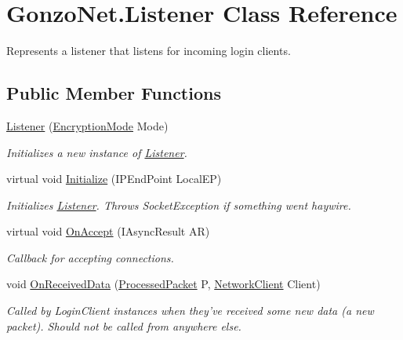 \hypertarget{class_gonzo_net_1_1_listener}{\section{Gonzo\+Net.\+Listener Class Reference}
\label{class_gonzo_net_1_1_listener}
}


Represents a listener that listens for incoming login clients.  


\subsection*{Public Member Functions}
\begin{DoxyCompactItemize}
\item 
\hyperlink{class_gonzo_net_1_1_listener_ae312dc6a8b04b59943c48ebebe649652}{Listener} (\hyperlink{namespace_gonzo_net_1_1_encryption_af0c5afc1c3ebbb6e3798067325cc50b9}{Encryption\+Mode} Mode)
\begin{DoxyCompactList}\small\item\em Initializes a new instance of \hyperlink{class_gonzo_net_1_1_listener}{Listener}. \end{DoxyCompactList}\item 
virtual void \hyperlink{class_gonzo_net_1_1_listener_ad43fb01c66819e744e8ad1e246a61190}{Initialize} (I\+P\+End\+Point Local\+E\+P)
\begin{DoxyCompactList}\small\item\em Initializes \hyperlink{class_gonzo_net_1_1_listener}{Listener}. Throws Socket\+Exception if something went haywire. \end{DoxyCompactList}\item 
virtual void \hyperlink{class_gonzo_net_1_1_listener_a98e103fe10d7c61053bad1669adbd1e4}{On\+Accept} (I\+Async\+Result A\+R)
\begin{DoxyCompactList}\small\item\em Callback for accepting connections. \end{DoxyCompactList}\item 
void \hyperlink{class_gonzo_net_1_1_listener_a29dab63b7e0e664199739ffcdbc2dc56}{On\+Received\+Data} (\hyperlink{class_gonzo_net_1_1_processed_packet}{Processed\+Packet} P, \hyperlink{class_gonzo_net_1_1_network_client}{Network\+Client} Client)
\begin{DoxyCompactList}\small\item\em Called by Login\+Client instances when they've received some new data (a new packet). Should not be called from anywhere else. \end{DoxyCompactList}\item 

\end{DoxyCompactItemize}
